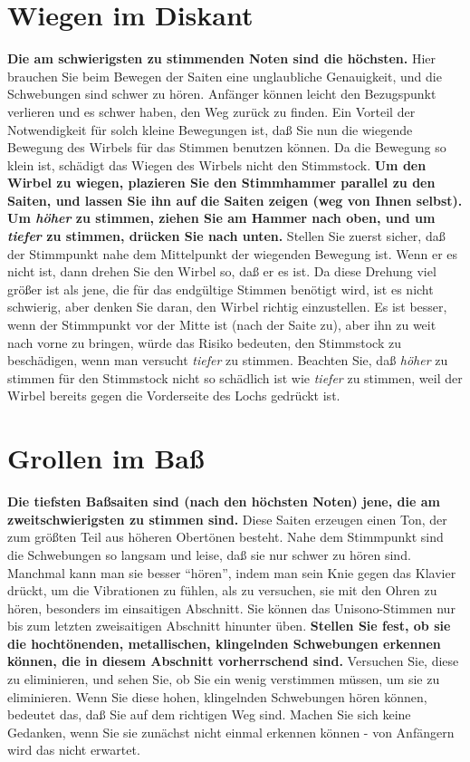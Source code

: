 \section{Wiegen im Diskant}
\label{c2_5_disk}

\textbf{Die am schwierigsten zu stimmenden Noten sind die höchsten.}
Hier brauchen Sie beim Bewegen der Saiten eine unglaubliche Genauigkeit, und die Schwebungen sind schwer zu hören.
Anfänger können leicht den Bezugspunkt verlieren und es schwer haben, den Weg zurück zu finden.
Ein Vorteil der Notwendigkeit für solch kleine Bewegungen ist, daß Sie nun die wiegende Bewegung des Wirbels für das Stimmen benutzen können.
Da die Bewegung so klein ist, schädigt das Wiegen des Wirbels nicht den Stimmstock.
\textbf{Um den Wirbel zu wiegen, plazieren Sie den Stimmhammer parallel zu den Saiten, und lassen Sie ihn auf die Saiten zeigen (weg von Ihnen selbst).
Um \textit{höher} zu stimmen, ziehen Sie am Hammer nach oben, und um \textit{tiefer} zu stimmen, drücken Sie nach unten.}
Stellen Sie zuerst sicher, daß der Stimmpunkt nahe dem Mittelpunkt der wiegenden Bewegung ist.
Wenn er es nicht ist, dann drehen Sie den Wirbel so, daß er es ist.
Da diese Drehung viel größer ist als jene, die für das endgültige Stimmen benötigt wird, ist es nicht schwierig, aber denken Sie daran, den Wirbel richtig einzustellen.
Es ist besser, wenn der Stimmpunkt vor der Mitte ist (nach der Saite zu), aber ihn zu weit nach vorne zu bringen, würde das Risiko bedeuten, den Stimmstock zu beschädigen, wenn man versucht \textit{tiefer} zu stimmen.
Beachten Sie, daß \textit{höher} zu stimmen für den Stimmstock nicht so schädlich ist wie \textit{tiefer} zu stimmen, weil der Wirbel bereits gegen die Vorderseite des Lochs gedrückt ist.
 

\hypertarget{c2_5i}{}
\section{Grollen im Baß}
\label{c2_5_bass}

\textbf{Die tiefsten Baßsaiten sind (nach den höchsten Noten) jene, die am zweitschwierigsten zu stimmen sind.}
Diese Saiten erzeugen einen Ton, der zum größten Teil aus höheren Obertönen besteht.
Nahe dem Stimmpunkt sind die Schwebungen so langsam und leise, daß sie nur schwer zu hören sind.
Manchmal kann man sie besser \enquote{hören}, indem man sein Knie gegen das Klavier drückt, um die Vibrationen zu fühlen, als zu versuchen, sie mit den Ohren zu hören, besonders im einsaitigen Abschnitt.
Sie können das Unisono-Stimmen nur bis zum letzten zweisaitigen Abschnitt hinunter üben.
\textbf{Stellen Sie fest, ob sie die hochtönenden, metallischen, klingelnden Schwebungen erkennen können, die in diesem Abschnitt vorherrschend sind.}
Versuchen Sie, diese zu eliminieren, und sehen Sie, ob Sie ein wenig verstimmen müssen, um sie zu eliminieren.
Wenn Sie diese hohen, klingelnden Schwebungen hören können, bedeutet das, daß Sie auf dem richtigen Weg sind.
Machen Sie sich keine Gedanken, wenn Sie sie zunächst nicht einmal erkennen können - von Anfängern wird das nicht erwartet.
 

